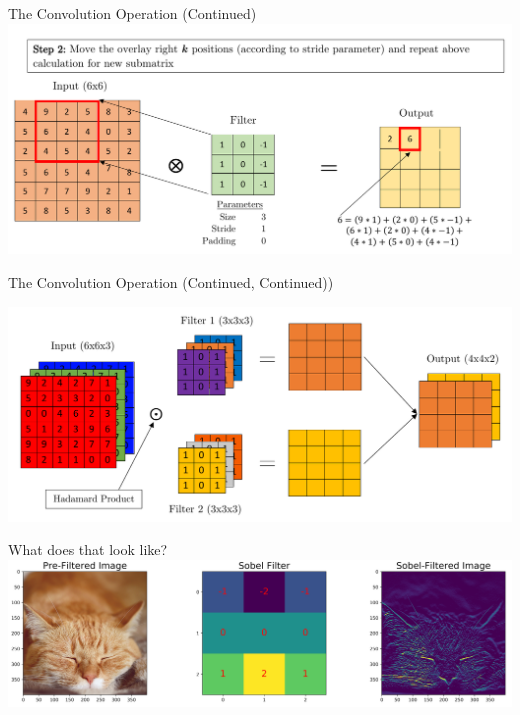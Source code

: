 \documentclass{beamer}
\begin{document}
\begin{frame}{The Convolution Operation (Continued)}
    \includegraphics[width=\textwidth]{nets/conv/convstep2.pdf}
\end{frame}
\begin{frame}{The Convolution Operation (Continued, Continued))}
\begin{center}
    \includegraphics[width=\textwidth]{nets/convslide1.pdf}
\end{center}
\end{frame}
\begin{frame}{What does that look like?}
    \includegraphics[width=\textwidth]{images/filterplots.jpg}\newline
\end{frame}
\end{document}
